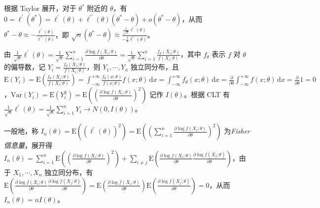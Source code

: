 \documentclass[../main.tex]{subfiles}
\begin{document}
根据 Taylor 展开，对于 $\theta^*$ 附近的 $\theta$，有 $0=\ell^\prime(\theta^*)=\ell^\prime(\theta)+\ell^{\prime\prime}(\theta)(\theta^*-\theta)+o(\theta^*-\theta)$，从而 $\theta^*-\theta\approx-\frac{\ell^\prime(\theta)}{\ell^{\prime\prime}(\theta)}$，即 $\sqrt n(\theta^*-\theta)\approx\frac{\frac1{\sqrt n}\ell^\prime(\theta)}{-\frac1n\ell^{\prime\prime}(\theta)}$。

由 $\frac1{\sqrt n}\ell^\prime(\theta)=\frac1{\sqrt n}\sum_{i=1}^n\frac{\partial\log f(X_i;\theta)}{\partial\theta}=\frac1{\sqrt n}\sum_{i=1}^n\frac{f_\theta(X_i;\theta)}{f(X_i;\theta)}$，其中 $f_\theta$ 表示 $f$ 对 $\theta$ 的偏导数，记 $Y_i=\frac{f_\theta(X_i;\theta)}{f(X_i;\theta)}$，则 $Y_1,\cdots,Y_n$ 独立同分布，且 $\mathrm E(Y_i)=\mathrm E\left(\frac{f_\theta(X_i;\theta)}{f(X_i;\theta)}\right)=\int_{-\infty}^{+\infty}\frac{f_\theta(x;\theta)}{f(x;\theta)}f(x;\theta)\,\mathrm dx=\int_{-\infty}^{+\infty}f_\theta(x;\theta)\,\mathrm dx=\frac{\partial}{\partial\theta}\int_{-\infty}^{+\infty}f(x;\theta)\,\mathrm dx=\frac{\partial}{\partial\theta}1=0$，$\mathrm{Var}(Y_i)=\mathrm E(Y_i^2)=\mathrm E\left(\left(\frac{\partial\log f(X_i;\theta)}{\partial\theta}\right)^2\right)$ 记作 $I(\theta)$。根据 CLT 有 $\frac1{\sqrt n}\ell^\prime(\theta)=\frac1{\sqrt n}\sum_{i=1}^nY_i\rightarrow N(0,I(\theta))$。

一般地，称 $I_n(\theta)=\mathrm E((\ell^\prime(\theta))^2)=\mathrm E\left(\left(\sum_{i=1}^n\frac{\partial\log f(X_i;\theta)}{\partial\theta}\right)^2\right)$ 为\emph{Fisher 信息量}，展开得 $I_n(\theta)=\sum_{i=1}^n\mathrm E\left(\left(\frac{\partial\log f(X_i;\theta)}{\partial\theta}\right)^2\right)+\sum_{i\neq j}\mathrm E\left(\frac{\partial\log f(X_i;\theta)}{\partial\theta}\frac{\partial\log f(X_j;\theta)}{\partial\theta}\right)$，由于 $X_1,\cdots,X_n$ 独立同分布，有 $\mathrm E\left(\frac{\partial\log f(X_i;\theta)}{\partial\theta}\frac{\partial\log f(X_j;\theta)}{\partial\theta}\right)=\mathrm E\left(\frac{\partial\log f(X_i;\theta)}{\partial\theta}\right)\mathrm E\left(\frac{\partial\log f(X_j;\theta)}{\partial\theta}\right)=0$，从而 $I_n(\theta)=nI(\theta)$。
\end{document}
